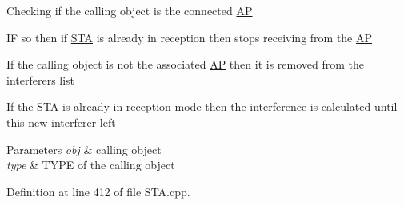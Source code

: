 \begin{DoxyEnumerate}
\item Checking if the calling object is the connected \hyperlink{classAP}{A\-P} \par

\item I\-F so then if \hyperlink{classSTA}{S\-T\-A} is already in reception then stops receiving from the \hyperlink{classAP}{A\-P} \par

\item If the calling object is not the associated \hyperlink{classAP}{A\-P} then it is removed from the interferers list \par

\item If the \hyperlink{classSTA}{S\-T\-A} is already in reception mode then the interference is calculated until this new interferer left \par

\begin{DoxyParams}{Parameters}
{\em obj} & calling object \\
\hline
{\em type} & T\-Y\-P\-E of the calling object \\
\hline
\end{DoxyParams}

\end{DoxyEnumerate}

Definition at line 412 of file S\-T\-A.\-cpp.



